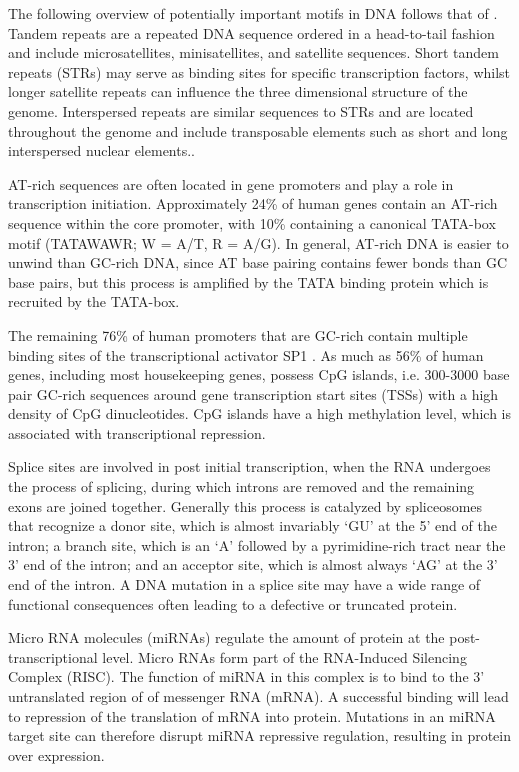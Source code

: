 \documentclass[12pt]{article}
\begin{document}
The following overview of potentially important motifs in DNA follows that of \citet{boeva2016analysis}. Tandem repeats are a repeated DNA sequence ordered in a head-to-tail fashion and include microsatellites, minisatellites, and satellite sequences. Short tandem repeats (STRs) may serve as binding sites for specific transcription factors, whilst longer satellite repeats can influence the three dimensional structure of the genome. Interspersed repeats are similar sequences to STRs and are located throughout the genome and include transposable elements such as short and long interspersed nuclear elements.. 

AT-rich sequences are often located in gene promoters and play a role in transcription initiation. Approximately 24\% of human genes contain an AT-rich sequence within the core promoter, with 10\% containing a canonical TATA-box motif (TATAWAWR; W = A/T, R = A/G). In general, AT-rich DNA is easier to unwind than GC-rich DNA, since AT base pairing contains fewer bonds than GC base pairs, but this process is amplified by the TATA binding protein which is recruited by the TATA-box. 

The remaining 76\% of human promoters that are GC-rich contain multiple binding sites of the transcriptional activator SP1 \citep{yang2007prevalence}. As much as 56\% of human genes, including most housekeeping genes, possess CpG islands, i.e. 300-3000 base pair GC-rich sequences around gene transcription start sites (TSSs) with a high density of CpG dinucleotides. CpG islands have a high methylation level, which is associated with transcriptional repression. 

Splice sites are involved in post initial transcription, when the RNA undergoes the process of splicing, during which introns are removed and the remaining exons are joined together. Generally this process is catalyzed by spliceosomes that recognize a donor site, which is almost invariably `GU' at the 5' end of the intron; a branch site, which is an `A' followed by a pyrimidine-rich tract near the 3' end of the intron; and an acceptor site, which is almost always `AG' at the 3' end of the intron. A DNA mutation in a splice site may have a wide range of functional consequences often leading to a defective or truncated protein.  

Micro RNA molecules (miRNAs) regulate the amount of protein at the post-transcriptional level. Micro RNAs form part of the RNA-Induced Silencing Complex (RISC). The function of miRNA in this complex is to bind to the 3' untranslated region of of messenger RNA (mRNA). A successful binding will lead to repression of the translation of mRNA into protein. Mutations in an miRNA target site can therefore disrupt miRNA repressive regulation, resulting in protein over expression.
\end{document}
